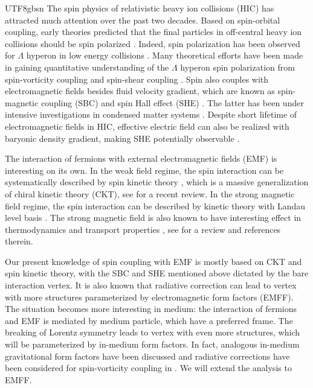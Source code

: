 \documentclass[11pt]{article}\def\baselinestretch{1.4}
\def\L{{\Lambda}}
\begin{document}
\begin{CJK}{UTF8}{gbsn}
The spin physics of relativistic heavy ion collisions (HIC) has attracted much attention over the past two decades. Based on spin-orbital coupling, early theories predicted that the final particles in off-central heavy ion collisions should be spin polarized \cite{Liang:2004ph,Liang:2004xn}. Indeed, spin polarization has been observed for $\L$ hyperon in low energy collisions \cite{STAR:2017ckg,STAR:2019erd}. Many theoretical efforts have been made in gaining quantitative understanding of the $\L$ hyperon spin polarization from spin-vorticity coupling \cite{Becattini:2013fla, Fang:2016vpj, Li:2017slc, Liu:2019krs, Becattini:2017gcx, Wei:2018zfb, Wu:2019eyi, Fu:2020oxj, Zhang:2019xya, Weickgenannt:2020aaf} and spin-shear coupling \cite{Hidaka:2017auj, Liu:2021uhn, Becattini:2021suc, Fu:2021pok, Becattini:2021iol, Yi:2021ryh, Lin:2022tma}. Spin also couples with electromagnetic fields besides fluid velocity gradient, which are known as spin-magnetic coupling (SBC) and spin Hall effect (SHE) \cite{Liu:2020dxg, Mameda:2022ojk}. The latter has been under intensive investigations in condensed matter systems \cite{RevModPhys.87.1213, PhysRevLett.95.226801}. Despite short lifetime of electromagnetic fields in HIC, effective electric field can also be realized with baryonic density gradient, making SHE potentially observable \cite{Fu:2022oup}.

The interaction of fermions with external electromagnetic fields (EMF) is interesting on its own. In the weak field regime, the spin interaction can be systematically described by spin kinetic theory \cite{Gao:2019znl, Weickgenannt:2019dks, Hattori:2019ahi, Liu:2020flb, Sheng:2020oqs,Yang:2020hri,Weickgenannt:2021cuo,Sheng:2021kfc,Lin:2021mvw}, which is a massive generalization of chiral kinetic theory (CKT), see \cite{Hidaka:2022dmn} for a recent review. In the strong magnetic field regime, the spin interaction can be described by kinetic theory with Landau level basis \cite{Sheng:2017lfu, Lin:2019fqo, Hattori:2016lqx, Fukushima:2019ugr}. The strong magnetic field is also known to have interesting effect in thermodynamics and transport properties \cite{Zhang:2020ben,Fang:2021ndj,Fukushima:2015wck,Hattori:2016lqx,Fukushima:2017lvb,Hattori:2017qih,Hattori:2016njk,Lin:2021sjw,Peng:2023rjj}, see \cite{Hattori:2023egw} for a review and references therein. 

Our present knowledge of spin coupling with EMF is mostly based on CKT and spin kinetic theory, with the SBC and SHE mentioned above dictated by the bare interaction vertex. It is also known that radiative correction can lead to vertex with more structures parameterized by electromagnetic form factors (EMFF). The situation becomes more interesting in medium: the interaction of fermions and EMF is mediated by medium particle, which have a preferred frame. The breaking of Lorentz symmetry leads to vertex with even more structures, which will be parameterized by in-medium form factors. In fact, analogous in-medium gravitational form factors have been discussed and radiative corrections have been considered for spin-vorticity coupling in \cite{Buzzegoli:2021jeh,Lin:2023ass}. We will extend the analysis to EMFF. 


\end{CJK}
\end{document}
